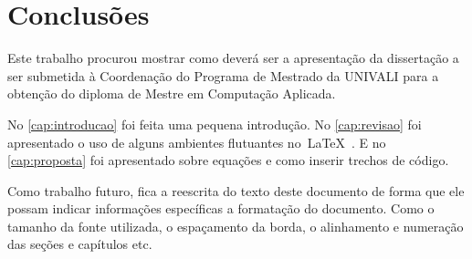\chapter{Conclusões}\label{cap:conclusoes}

Este trabalho procurou mostrar como deverá ser a apresentação da dissertação a ser submetida à Coordenação do Programa de Mestrado da \gls{UNIVALI} para a obtenção do diploma de Mestre em Computação Aplicada.

No \autoref{cap:introducao} foi feita uma pequena introdução. No \autoref{cap:revisao} foi apresentado o uso de alguns ambientes flutuantes no~\LaTeX~. E no \autoref{cap:proposta} foi apresentado sobre equações e como inserir trechos de código.

Como trabalho futuro, fica a reescrita do texto deste documento de forma que ele possam indicar informações específicas a formatação do documento. Como o tamanho da fonte utilizada, o espaçamento da borda, o alinhamento e numeração das seções e capítulos etc.
